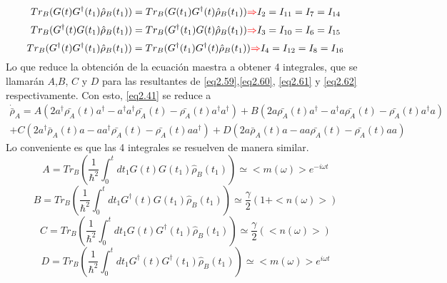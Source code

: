 \documentclass{book}
\begin{document}
 \begin{equation}\label{eq2.60}{Tr_B(G(t)G^\dag(t_1)\hat{\rho}_B(t_1))=Tr_B(G(t_1)G^\dag(t)\hat{\rho}_B(t_1)) \textcolor{red}{\Rightarrow} I_2=I_{11}=I_7=I_{14}}\end{equation}
 \begin{equation}\label{eq2.61}{Tr_B(G^\dag(t)G(t_1)\hat{\rho}_B(t_1))=Tr_B(G^\dag(t_1)G(t)\hat{\rho}_B(t_1)) \textcolor{red}{\Rightarrow} I_3=I_{10}=I_6=I_{15}}\end{equation}
 \begin{equation}\label{eq2.62}{Tr_B(G^\dag(t)G^\dag(t_1)\hat{\rho}_B(t_1))=Tr_B(G^\dag(t_1)G^\dag(t)\hat{\rho}_B(t_1)) \textcolor{red}{\Rightarrow} I_4=I_{12}=I_8=I_{16} }\end{equation}
 Lo que reduce la obtención de la ecuación maestra a obtener 4 integrales, que se llamarán $A$,$B$, $C$ y $D$ para las resultantes de \textcolor{blue}{\ref{eq2.59}},\textcolor{blue}{\ref{eq2.60}}, \textcolor{blue}{\ref{eq2.61}} y \textcolor{blue}{\ref{eq2.62}} respectivamente.
 Con esto, \textcolor{blue}{\ref{eq2.41}} se reduce a
 \begin{equation}\label{eq2.63}\begin{aligned}\dot{\bar{\rho}}_A=A(2a^\dag \bar{\rho_A}(t)a^\dag-a^\dag a^\dag\bar{\rho_A}(t)-\bar{\rho_A}(t)a^\dag a^\dag)+B(2a\bar{\rho_A}(t)a^\dag-a^\dag a\bar{\rho_A}(t)-\bar{\rho_A}(t)a^\dag a) \\ +C(2a^\dag \bar{\rho}_A(t)a-aa^\dag\bar{\rho_A}(t)-\bar{\rho_A}(t)a a^\dag)+D(2a \bar{\rho}_A(t)a-a a\bar{\rho_A}(t)-\bar{\rho_A}(t)a a)\end{aligned}\end{equation}
 Lo conveniente es que las 4 integrales se resuelven de manera similar.
\begin{equation}\label{eq2.64} A= Tr_B (\frac{1}{\hslash^2}\int_0^t dt_1 G(t)G(t_1)\hat{\rho}_B(t_1)) \simeq <m(\omega)> e^{-i\omega t}\end{equation}
\begin{equation}\label{eq2.65} B= Tr_B (\frac{1}{\hslash^2}\int_0^t dt_1 G^\dag(t)G(t_1)\hat{\rho}_B(t_1)) \simeq \frac{\gamma}{2} (1+<n(\omega)>) \end{equation}
\begin{equation}\label{eq2.66}  C= Tr_B (\frac{1}{\hslash^2}\int_0^t dt_1 G(t)G^\dag(t_1)\hat{\rho}_B(t_1)) \simeq \frac{\gamma}{2}(<n(\omega)>)
\end{equation}
\begin{equation}\label{eq2.67} D= Tr_B (\frac{1}{\hslash^2}\int_0^t dt_1 G^\dag(t)G^\dag(t_1)\hat{\rho}_B(t_1)) \simeq <m(\omega)> e^{i\omega t} \end{equation}
\end{document}
